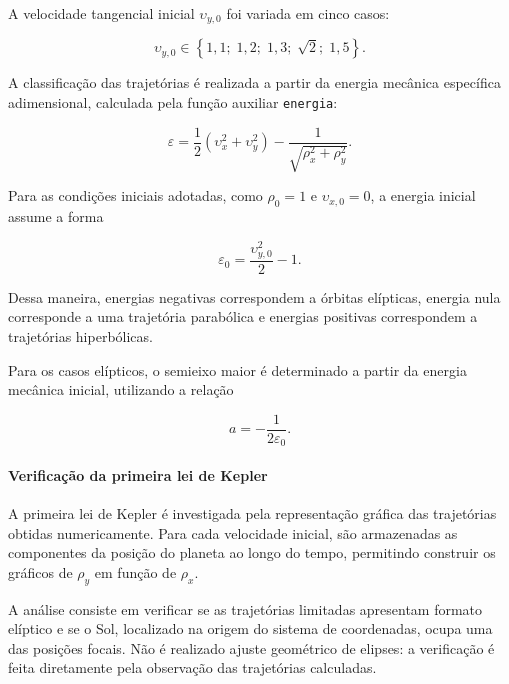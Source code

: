 \documentclass[12pt,a4paper]{article}
\begin{document}
A velocidade tangencial inicial $\upsilon_{y,0}$ foi variada em cinco casos:

\begin{equation}
    \upsilon_{y,0}\in
    \left\{
    1,1;\;
    1,2;\;
    1,3;\;
    \sqrt{2};\;
    1,5
    \right\}.
\end{equation}

A classificação das trajetórias é realizada a partir da energia mecânica específica adimensional, calculada pela função auxiliar \texttt{energia}:

\begin{equation}
    \varepsilon=
    \frac{1}{2}
    \left(\upsilon_x^2+\upsilon_y^2\right)
    -\frac{1}{\sqrt{\rho_x^2+\rho_y^2}}.
\end{equation}

Para as condições iniciais adotadas, como $\rho_0=1$ e $\upsilon_{x,0}=0$, a energia inicial assume a forma

\begin{equation}
    \varepsilon_0=
    \frac{\upsilon_{y,0}^2}{2}-1.
\end{equation}

Dessa maneira, energias negativas correspondem a órbitas elípticas, energia nula corresponde a uma trajetória parabólica e energias positivas correspondem a trajetórias hiperbólicas.

Para os casos elípticos, o semieixo maior é determinado a partir da energia mecânica inicial, utilizando a relação

\begin{equation}
    a=-\frac{1}{2\varepsilon_0}.
\end{equation}

\paragraph{Verificação da primeira lei de Kepler}

A primeira lei de Kepler é investigada pela representação gráfica das trajetórias obtidas numericamente. Para cada velocidade inicial, são armazenadas as componentes da posição do planeta ao longo do tempo, permitindo construir os gráficos de $\rho_y$ em função de $\rho_x$.

A análise consiste em verificar se as trajetórias limitadas apresentam formato elíptico e se o Sol, localizado na origem do sistema de coordenadas, ocupa uma das posições focais. Não é realizado ajuste geométrico de elipses: a verificação é feita diretamente pela observação das trajetórias calculadas.
\end{document}
